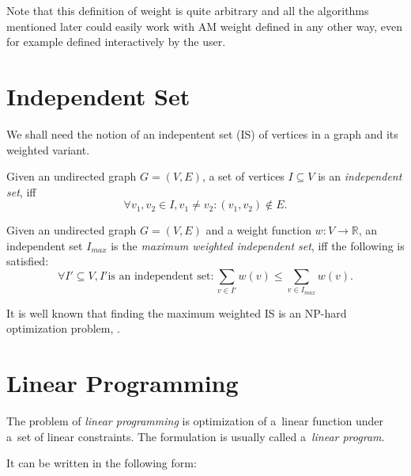 Note that this definition of weight is quite arbitrary and all the algorithms mentioned later could easily work with AM weight defined in any other way, even for example defined interactively by the user.

\section{Independent Set}
\label{section-definitions-is}


We shall need the notion of an indepentent set (IS) of vertices in a graph and its weighted variant.

\begin{define}
Given an undirected graph $G = (V, E)$, a set of vertices $I \subseteq V$ is an \textit{independent set}, iff
\[\forall v_1, v_2 \in I, v_1 \neq v_2: (v_1, v_2) \notin E.\]
\end{define}

\begin{define}
Given an undirected graph $G = (V, E)$ and a weight function $w: V \rightarrow \mathbb{R}$, an independent set $I_{max}$ is the \textit{maximum weighted independent set}, iff the following is satisfied:
\[\forall I' \subseteq V, I' \text{is an independent set}: \sum_{v \in I'} w(v) \leqslant \sum_{v \in I_{max}} w(v).\]
\end{define}

It is well known that finding the maximum weighted IS is an NP-hard optimization problem, \cite{JM1986425}.

\section{Linear Programming}

The problem of \textit{linear programming} is optimization of a~linear function under a~set of linear constraints. The formulation is usually called a~\textit{linear program}. 

It can be written in the following form:

